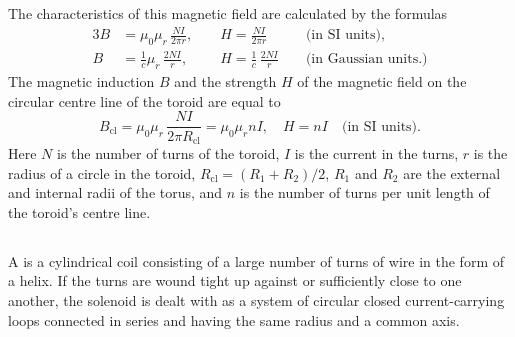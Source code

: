 The characteristics of this magnetic field are calculated by the formulas
\begin{alignat*}{3}%
B & = \mu_{0} \mu_{r}\, \frac{NI}{2\pi r}, \,\, && H  = \frac{NI}{2 \pi r} &&  \text{(in SI units),} \\
B & =  \frac{1}{c} \mu_{r}\, \frac{2NI}{r}, \,\, && H  = \frac{1}{c} \, \frac{2 N I}{r}\,\, &&  \text{(in Gaussian units.)}
\end{alignat*}
The magnetic induction ${B}$ and the strength ${H}$ of the magnetic field on the circular centre line of the toroid are equal to
\begin{equation*}%
B_{\text{cl}} = \mu_{0} \mu_{r}\, \frac{NI}{2\pi R_{\text{cl}}} =  \mu_{0} \mu_{r}nI, \quad H = nI \quad   \text{(in SI units).}
\end{equation*}
Here $N$ is the number of turns of the toroid, $I$ is the current in the turns, $r$ is the radius of a circle in the toroid, $ R_{\text{cl}} = (R_{1} + R_{2})/2$, $R_{1}$ and $R_{2}$ are the external and internal radii of the torus, and $n$ is the number of turns per unit length of the toroid's centre line.

\subsection{}\label{23.3.8} A  is a cylindrical coil consisting of a large number of turns of wire in the form of a helix. If the turns are wound tight up against or sufficiently close to one another, the solenoid is dealt with as a system of circular closed current-carrying loops connected in series and having the same radius and a common axis.


